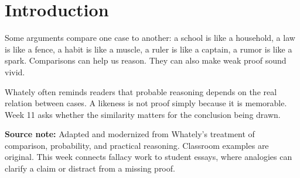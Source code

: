 \documentclass[12pt]{article}
\newcommand{\focusbox}[1]{\par\vspace{0.4em}\noindent\begingroup\setlength{\fboxsep}{6pt}\colorbox{gray!12}{\begin{minipage}{\dimexpr\linewidth-2\fboxsep\relax}#1\end{minipage}}\endgroup\par\vspace{0.5em}}
\begin{document}
\section*{Introduction}
Some arguments compare one case to another: a school is like a household, a law is like a fence, a habit is like a muscle, a ruler is like a captain, a rumor is like a spark. Comparisons can help us reason. They can also make weak proof sound vivid.

Whately often reminds readers that probable reasoning depends on the real relation between cases. A likeness is not proof simply because it is memorable. Week 11 asks whether the similarity matters for the conclusion being drawn.

\focusbox{\textbf{Source note:} Adapted and modernized from Whately's treatment of comparison, probability, and practical reasoning. Classroom examples are original. This week connects fallacy work to student essays, where analogies can clarify a claim or distract from a missing proof.}
\end{document}
